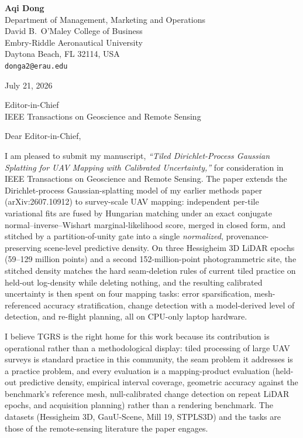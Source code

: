 \documentclass[11pt]{article}
\begin{document}
{\bfseries Aqi Dong}\\
Department of Management, Marketing and Operations\\
David B.\ O'Maley College of Business\\
Embry-Riddle Aeronautical University\\
Daytona Beach, FL 32114, USA\\
\texttt{donga2@erau.edu}

\vspace{1.2\baselineskip}
July 21, 2026

\vspace{1.2\baselineskip}
Editor-in-Chief\\
IEEE Transactions on Geoscience and Remote Sensing

\vspace{1.2\baselineskip}
Dear Editor-in-Chief,

I am pleased to submit my manuscript, \emph{``Tiled Dirichlet-Process Gaussian
Splatting for UAV Mapping with Calibrated Uncertainty,''} for consideration in
IEEE Transactions on Geoscience and Remote Sensing. The paper extends the
Dirichlet-process Gaussian-splatting model of my earlier methods paper
(arXiv:2607.10912) to survey-scale UAV mapping: independent per-tile
variational fits are fused by Hungarian matching under an exact conjugate
normal--inverse--Wishart marginal-likelihood score, merged in closed form, and
stitched by a partition-of-unity gate into a single \emph{normalized},
provenance-preserving scene-level predictive density. On three Hessigheim 3D
LiDAR epochs (59--129 million points) and a second 152-million-point
photogrammetric site, the stitched density matches the hard seam-deletion
rules of current tiled practice on held-out log-density while deleting
nothing, and the resulting calibrated uncertainty is then spent on four
mapping tasks: error sparsification, mesh-referenced accuracy stratification,
change detection with a model-derived level of detection, and re-flight
planning, all on CPU-only laptop hardware.

I believe TGRS is the right home for this work because its contribution is
operational rather than a methodological display: tiled processing of large UAV
surveys is standard practice in this community, the seam problem it addresses
is a practice problem, and every evaluation is a mapping-product evaluation
(held-out predictive density, empirical interval coverage, geometric
accuracy against the benchmark's reference mesh, null-calibrated change
detection on repeat LiDAR epochs, and acquisition planning) rather than a
rendering benchmark. The datasets (Hessigheim 3D, GauU-Scene, Mill 19,
STPLS3D) and the tasks are those of the remote-sensing literature the paper
engages.
\end{document}
